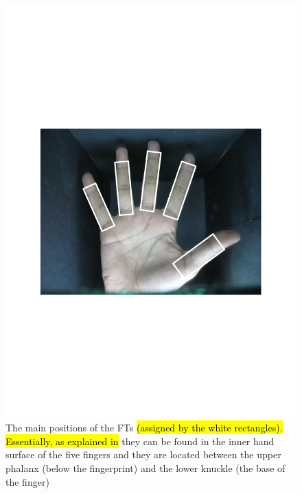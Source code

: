 \documentclass[review]{elsarticle}
\begin{document}
	\begin{figure}[!h]
		\centering
		\includegraphics[page=1,scale=.7,trim=3cm 8cm 3cm 8cm,clip]{FTs_locations.pdf}
		\caption{The main positions of the FTs \hl{(assigned by the white rectangles). Essentially, as explained in} \cite{Al-Nima2017Signal} they can be found in the inner hand surface of the five fingers and they are located between the upper phalanx (below the fingerprint) and the lower knuckle (the base of the finger)}
		\label{fig:FTs_locations}
	\end{figure}
\end{document}
